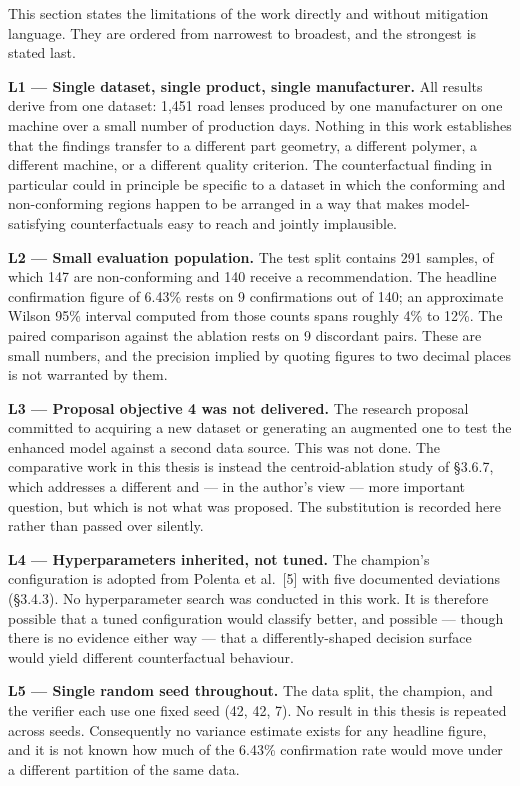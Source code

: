 This section states the limitations of the work directly and without mitigation language. They are ordered from narrowest to broadest, and the strongest is stated last.

\textbf{L1 --- Single dataset, single product, single manufacturer.} All results derive from one dataset: 1,451 road lenses produced by one manufacturer on one machine over a small number of production days. Nothing in this work establishes that the findings transfer to a different part geometry, a different polymer, a different machine, or a different quality criterion. The counterfactual finding in particular could in principle be specific to a dataset in which the conforming and non-conforming regions happen to be arranged in a way that makes model-satisfying counterfactuals easy to reach and jointly implausible.

\textbf{L2 --- Small evaluation population.} The test split contains 291 samples, of which 147 are non-conforming and 140 receive a recommendation. The headline confirmation figure of 6.43\% rests on 9 confirmations out of 140; an approximate Wilson 95\% interval computed from those counts spans roughly 4\% to 12\%. The paired comparison against the ablation rests on 9 discordant pairs. These are small numbers, and the precision implied by quoting figures to two decimal places is not warranted by them.

\textbf{L3 --- Proposal objective 4 was not delivered.} The research proposal committed to acquiring a new dataset or generating an augmented one to test the enhanced model against a second data source. This was not done. The comparative work in this thesis is instead the centroid-ablation study of §3.6.7, which addresses a different and --- in the author's view --- more important question, but which is not what was proposed. The substitution is recorded here rather than passed over silently.

\textbf{L4 --- Hyperparameters inherited, not tuned.} The champion's configuration is adopted from Polenta et al.~{[}5{]} with five documented deviations (§3.4.3). No hyperparameter search was conducted in this work. It is therefore possible that a tuned configuration would classify better, and possible --- though there is no evidence either way --- that a differently-shaped decision surface would yield different counterfactual behaviour.

\textbf{L5 --- Single random seed throughout.} The data split, the champion, and the verifier each use one fixed seed (42, 42, 7). No result in this thesis is repeated across seeds. Consequently no variance estimate exists for any headline figure, and it is not known how much of the 6.43\% confirmation rate would move under a different partition of the same data.

